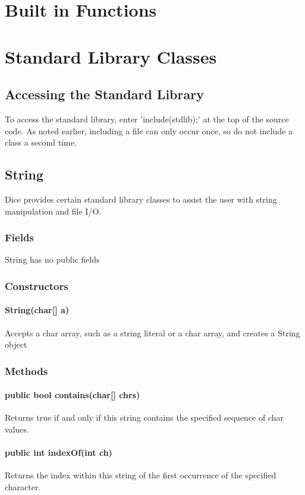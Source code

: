\begin{homeworkProblem}
	\section{Built in Functions}
	\section{Standard Library Classes}
	\subsection{Accessing the Standard Library}
	To access the standard library, enter 'include(stdlib);' at the top of the source code. As noted earlier, including a file can only occur once, so do not include a class a second time. 
	
	\subsection{String}
	Dice provides certain standard library classes to assist the user with string manipulation and file I/O.

	\subsubsection{Fields}
	String has no public fields

	\subsubsection{Constructors}
	\paragraph{String(char[] a)}
	Accepts a char array, such as a string literal or a char array, and creates a String object

	\subsubsection{Methods}
	\paragraph{public bool contains(char[] chrs)}
	Returns true if and only if this string contains the specified sequence of char values.
	\paragraph{public int indexOf(int ch)}
	Returns the index within this string of the first occurrence of the specified character.

\end{homeworkProblem}
